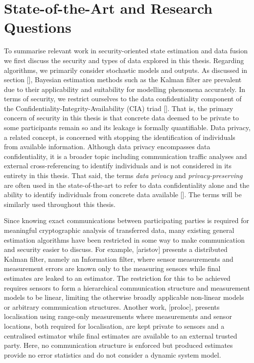 \section{State-of-the-Art and Research Questions}\label{sec:intro:sota_and_rq}
To summarise relevant work in security-oriented state estimation and data fusion we first discuss the security and types of data explored in this thesis. Regarding algorithms, we primarily consider stochastic models and outputs. As discussed in section [], Bayesian estimation methods such as the Kalman filter are prevalent due to their applicability and suitability for modelling phenomena accurately. In terms of security, we restrict ourselves to the data confidentiality component of the Confidentiality-Integrity-Availability (CIA) triad []. That is, the primary concern of security in this thesis is that concrete data deemed to be private to some participants remain so and its leakage is formally quantifiable. Data privacy, a related concept, is concerned with stopping the identification of individuals from available information. Although data privacy encompasses data confidentiality, it is a broader topic including communication traffic analyses and external cross-referencing to identify individuals and is not considered in its entirety in this thesis. That said, the terms \textit{data privacy} and \textit{privacy-preserving} are often used in the state-of-the-art to refer to data confidentiality alone and the ability to identify individuals from concrete data available []. The terms will be similarly used throughout this thesis. 

Since knowing exact communications between participating parties is required for meaningful cryptographic analysis of transferred data, many existing general estimation algorithms have been restricted in some way to make communication and security easier to discuss. For example, [aristov] presents a distributed Kalman filter, namely an Information filter, where sensor measurements and measurement errors are known only to the measuring sensors while final estimates are leaked to an estimator. The restriction for this to be achieved requires sensors to form a hierarchical communication structure and measurement models to be linear, limiting the otherwise broadly applicable non-linear models or arbitrary communication structures. Another work, [proloc], presents localisation using range-only measurements where measurements and sensor locations, both required for localisation, are kept private to sensors and a centralised estimator while final estimates are available to an external trusted party. Here, no communication structure is enforced but produced estimates provide no error statistics and do not consider a dynamic system model.

